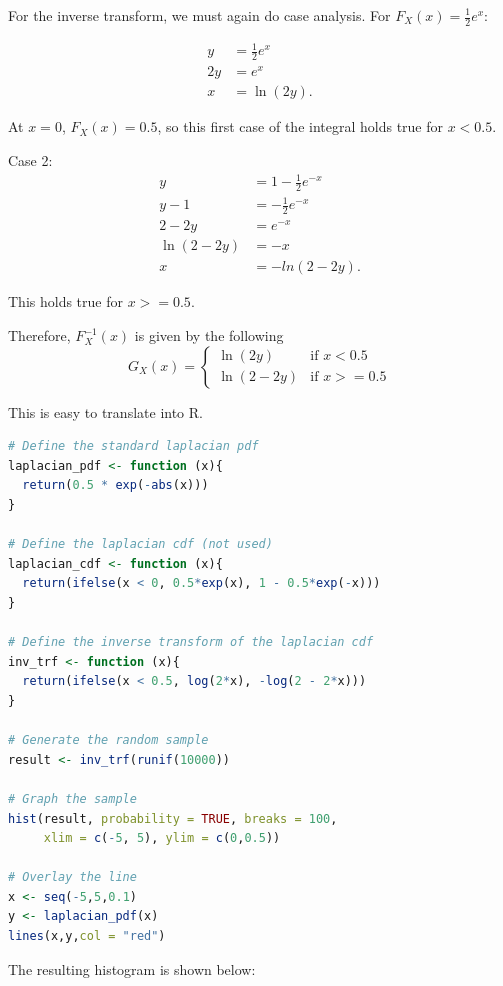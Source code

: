 \documentclass{amsart}
\theoremstyle{definition}
\theoremstyle{remark}
\begin{document}
\begin{enumerate}
For the inverse transform, we must again do case analysis. For $F_X(x) = \frac{1}{2}e^{x}$: 

\begin{align*}
y &= \frac{1}{2}e^{x}\\
2y &= e^{x}\\
x &= \ln (2y).
\end{align*}

At $x = 0$, $F_X(x) = 0.5$, so this first case of the integral holds true for $x < 0.5$. 

Case 2: 
\begin{align*}
y &= 1 - \frac{1}{2}e^{-x}\\
y - 1 &= - \frac{1}{2} e^{-x}\\
2 - 2y &= e^{-x}\\
\ln{(2-2y)} &= -x\\
x &= -ln{(2-2y)}.
\end{align*}

This holds true for $x >= 0.5$.

Therefore, $F^{-1}_X(x)$ is given by the following
$$G_X(x) = \begin{cases}
    \ln{(2y)} & \text{if $x < 0.5$} \\
    \ln{(2 - 2y)} & \text{if $x >= 0.5$}
    \end{cases}
$$

This is easy to translate into R. 

\begin{lstlisting}[language=R]
# Define the standard laplacian pdf
laplacian_pdf <- function (x){
  return(0.5 * exp(-abs(x)))
}

# Define the laplacian cdf (not used)
laplacian_cdf <- function (x){
  return(ifelse(x < 0, 0.5*exp(x), 1 - 0.5*exp(-x)))
}

# Define the inverse transform of the laplacian cdf
inv_trf <- function (x){
  return(ifelse(x < 0.5, log(2*x), -log(2 - 2*x)))
}

# Generate the random sample
result <- inv_trf(runif(10000))

# Graph the sample
hist(result, probability = TRUE, breaks = 100,
     xlim = c(-5, 5), ylim = c(0,0.5))

# Overlay the line
x <- seq(-5,5,0.1)
y <- laplacian_pdf(x)
lines(x,y,col = "red")
\end{lstlisting}

The resulting histogram is shown below:



\end{enumerate}
\end{document}
